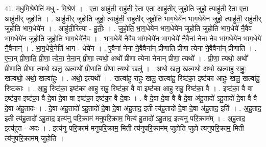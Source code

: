 \documentclass[17pt]{extarticle}
\begin{document}
41. म॒धु॒मि॒श्रेणेति॑ मधु - मि॒श्रेण॑ । . ए॒ता आहु॑ती॒ राहु॑ती रे॒ता ए॒ता आहु॑तीर् जुहोति जुहो॒ त्याहु॑ती रे॒ता ए॒ता आहु॑तीर् जुहोति । . आहु॑तीर् जुहोति जुहो॒ त्याहु॑ती॒ राहु॑तीर् जुहोति भाग॒धेये॑न भाग॒धेये॑न जुहो॒ त्याहु॑ती॒ राहु॑तीर् जुहोति भाग॒धेये॑न । . आहु॑ती॒रित्या - हु॒तीः॒ । . जु॒हो॒ति॒ भा॒ग॒धेये॑न भाग॒धेये॑न जुहोति जुहोति भाग॒धेये॑ नै॒वैव भा॑ग॒धेये॑न जुहोति जुहोति भाग॒धेये॑नै॒व । . भा॒ग॒धेये॑ नै॒वैव भा॑ग॒धेये॑न भाग॒धेये॑ नै॒वैना॑ नेना ने॒व भा॑ग॒धेये॑न भाग॒धेये॑
नै॒वैनान्॑ । . भा॒ग॒धेये॒नेति॑ भाग - धेये॑न । . ए॒वैना॑ नेना ने॒वैवैना᳚न् प्रीणाति प्रीणा त्येना ने॒वैवैना᳚न् प्रीणाति । . ए॒ना॒न् प्री॒णा॒ति॒ प्री॒णा॒ त्ये॒ना॒ ने॒ना॒न् प्री॒णा॒ त्यथो॒ अथो᳚ प्रीणा त्येना नेनान् प्रीणा॒ त्यथो᳚ । . प्री॒णा॒ त्यथो॒ अथो᳚ प्रीणाति प्रीणा॒ त्यथो॒ खलु॒ खल्वथो᳚ प्रीणाति प्रीणा॒ त्यथो॒ खलु॑ । . अथो॒ खलु॒ खल्वथो॒ अथो॒ खल्वा॑हु राहुः॒ खल्वथो॒ अथो॒ खल्वा॑हुः । . अथो॒ इत्यथो᳚ । . खल्वा॑हु राहुः॒ खलु॒ खल्वा॑हु॒ रिष्ट॑का॒ इष्ट॑का आहुः॒ खलु॒ खल्वा॑हु॒ रिष्ट॑काः । . आ॒हु॒ रिष्ट॑का॒ इष्ट॑का आहु राहु॒ रिष्ट॑का॒ वै वा इष्ट॑का आहु राहु॒ रिष्ट॑का॒ वै । . इष्ट॑का॒ वै वा इष्ट॑का॒ इष्ट॑का॒ वै दे॒वा दे॒वा वा इष्ट॑का॒ इष्ट॑का॒ वै दे॒वाः । . वै दे॒वा दे॒वा वै वै दे॒वा अ॑हु॒तादो॑ ऽहु॒तादो॑ दे॒वा वै वै दे॒वा अ॑हु॒तादः॑ । . दे॒वा अ॑हु॒तादो॑ ऽहु॒तादो॑ दे॒वा दे॒वा अ॑हु॒ताद॒ इती त्य॑हु॒तादो॑ दे॒वा दे॒वा अ॑हु॒ताद॒ इति॑ । . अ॒हु॒ताद॒ इती त्य॑हु॒तादो॑ ऽहु॒ताद॒ इत्य॑नु परि॒क्राम॑ मनुपरि॒क्राम॒ मित्य॑ हु॒तादो॑ ऽहु॒ताद॒ इत्य॑नु परि॒क्राम᳚म् । . अ॒हु॒ताद॒ इत्य॑हुत - अदः॑ । . इत्य॑नु परि॒क्राम॑ मनुपरि॒क्राम॒ मिती त्य॑नुपरि॒क्राम॑म् जुहोति जुहो त्यनुपरि॒क्राम॒ मिती त्य॑नुपरि॒क्राम॑म् जुहोति । \newline
\pagebreak
{}
\end{document}
